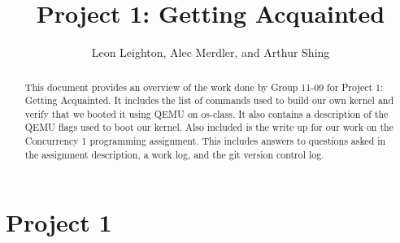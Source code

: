\documentclass[journal, letterpaper, draftclsnofoot, onecolumn, 10pt]{IEEEtran}
\begin{document}
\title{Project 1: Getting Acquainted}
\author{Leon Leighton, Alec Merdler, and Arthur Shing}

\begin{titlepage}
    \centering
    \maketitle
    \begin{abstract}
      This document provides an overview of the work done by Group 11-09 for Project 1: Getting Acquainted.
      It includes the list of commands used to build our own kernel and verify that we booted it using QEMU on os-class.
      It also contains a description of the QEMU flags used to boot our kernel.
      Also included is the write up for our work on the Concurrency 1 programming assignment.
      This includes answers to questions asked in the assignment description, a work log, and the git version control log.
    \end{abstract}


\end{titlepage}

\tableofcontents
\clearpage


\section{Project 1}
\end{document}
